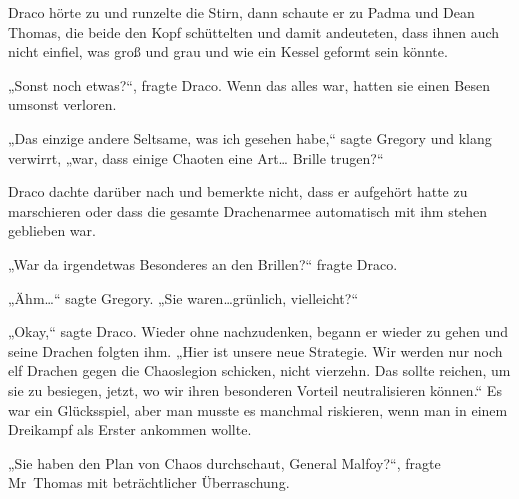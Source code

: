 Draco hörte zu und runzelte die Stirn, dann schaute er zu Padma und Dean Thomas, die beide den Kopf schüttelten und damit andeuteten, dass ihnen auch nicht einfiel, was groß und grau und wie ein Kessel geformt sein könnte.

„Sonst noch etwas?“, fragte Draco. Wenn das alles war, hatten sie einen Besen umsonst verloren.

„Das einzige andere Seltsame, was ich gesehen habe,“ sagte Gregory und klang verwirrt, „war, dass einige Chaoten eine Art… Brille trugen?“

Draco dachte darüber nach und bemerkte nicht, dass er aufgehört hatte zu marschieren oder dass die gesamte Drachenarmee automatisch mit ihm stehen geblieben war.

„War da irgendetwas Besonderes an den Brillen?“ fragte Draco.

„Ähm…“ sagte Gregory. „Sie waren…grünlich, vielleicht?“

„Okay,“ sagte Draco. Wieder ohne nachzudenken, begann er wieder zu gehen und seine Drachen folgten ihm. „Hier ist unsere neue Strategie. Wir werden nur noch elf Drachen gegen die Chaoslegion schicken, nicht vierzehn. Das sollte reichen, um sie zu besiegen, jetzt, wo wir ihren besonderen Vorteil neutralisieren können.“ Es war ein Glücksspiel, aber man musste es manchmal riskieren, wenn man in einem Dreikampf als Erster ankommen wollte.

„Sie haben den Plan von Chaos durchschaut, General Malfoy?“, fragte Mr~Thomas mit beträchtlicher Überraschung.

